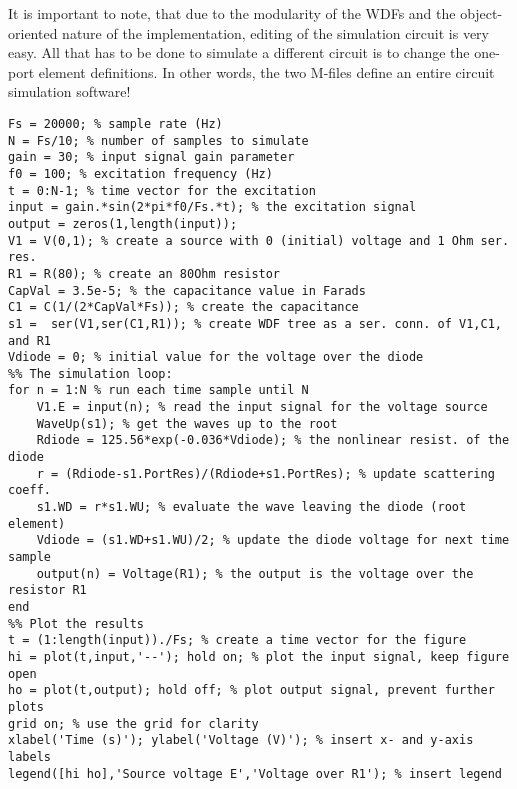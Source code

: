 \documentclass[10pt,a4paper,oneside]{article}
\begin{document}
It is important to note, that due to the modularity of the WDFs and the object-oriented nature of the implementation, editing of the simulation circuit is very easy. All that has to be done to simulate a different circuit is to change the one-port element definitions. In other words, the two M-files define an entire circuit simulation software!
\begin{lstlisting}
Fs = 20000; % sample rate (Hz)
N = Fs/10; % number of samples to simulate
gain = 30; % input signal gain parameter
f0 = 100; % excitation frequency (Hz)
t = 0:N-1; % time vector for the excitation
input = gain.*sin(2*pi*f0/Fs.*t); % the excitation signal
output = zeros(1,length(input));
V1 = V(0,1); % create a source with 0 (initial) voltage and 1 Ohm ser. res.
R1 = R(80); % create an 80Ohm resistor
CapVal = 3.5e-5; % the capacitance value in Farads
C1 = C(1/(2*CapVal*Fs)); % create the capacitance
s1 =  ser(V1,ser(C1,R1)); % create WDF tree as a ser. conn. of V1,C1, and R1
Vdiode = 0; % initial value for the voltage over the diode
%% The simulation loop:
for n = 1:N % run each time sample until N
	V1.E = input(n); % read the input signal for the voltage source
	WaveUp(s1); % get the waves up to the root
	Rdiode = 125.56*exp(-0.036*Vdiode); % the nonlinear resist. of the diode
	r = (Rdiode-s1.PortRes)/(Rdiode+s1.PortRes); % update scattering coeff.
	s1.WD = r*s1.WU; % evaluate the wave leaving the diode (root element)
	Vdiode = (s1.WD+s1.WU)/2; % update the diode voltage for next time sample
	output(n) = Voltage(R1); % the output is the voltage over the resistor R1
end 
%% Plot the results
t = (1:length(input))./Fs; % create a time vector for the figure
hi = plot(t,input,'--'); hold on; % plot the input signal, keep figure open
ho = plot(t,output); hold off; % plot output signal, prevent further plots
grid on; % use the grid for clarity
xlabel('Time (s)'); ylabel('Voltage (V)'); % insert x- and y-axis labels
legend([hi ho],'Source voltage E','Voltage over R1'); % insert legend

\end{lstlisting}
\end{document}
